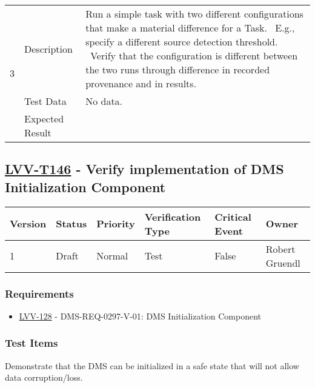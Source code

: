 \begin{longtable}[]{p{1.3cm}p{2cm}p{13cm}}
            \multirow{3}{*}{ 3 } & Description &
            \begin{minipage}[t]{13cm}{\footnotesize
            Run a simple task with two different configurations that make a material
difference for a Task. ~E.g., specify a different source detection
threshold. ~Verify that the configuration is different between the two
runs through difference in recorded provenance and in results.

            \vspace{\dp0}
            } \end{minipage} \\ \cline{2-3}
            & Test Data &
            \begin{minipage}[t]{13cm}{\footnotesize
                No data.
                \vspace{\dp0}
            } \end{minipage} \\ \cline{2-3}
            & Expected Result &
        \\ \midrule
    \end{longtable}

\subsection{\href{https://jira.lsstcorp.org/secure/Tests.jspa\#/testCase/LVV-T146}{LVV-T146}
    - Verify implementation of DMS Initialization Component}\label{lvv-t146}

\begin{longtable}[]{llllll}
\toprule
Version & Status & Priority & Verification Type & Critical Event & Owner
\\\midrule
1 & Draft & Normal &
Test & False & Robert Gruendl
\\\bottomrule
\end{longtable}

\subsubsection{Requirements}
\begin{itemize}
\item \href{https://jira.lsstcorp.org/browse/LVV-128}{LVV-128} - DMS-REQ-0297-V-01: DMS Initialization Component
\end{itemize}

\subsubsection{Test Items}
Demonstrate that the DMS can be initialized in a safe state that will
not allow data corruption/loss.



